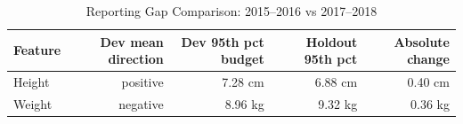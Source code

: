 \begin{table}[htbp]
  \centering
  \caption{Reporting Gap Comparison: 2015--2016 vs 2017--2018}
  \label{tab:gap}
  \small
  \begin{tabular}{lrrrr}
    \toprule
    Feature & Dev mean direction & Dev 95th pct budget & Holdout 95th pct & Absolute change \\
    \midrule
    Height & positive & 7.28 cm & 6.88 cm & 0.40 cm \\
    Weight & negative & 8.96 kg & 9.32 kg & 0.36 kg \\
    \bottomrule
  \end{tabular}
\end{table}
